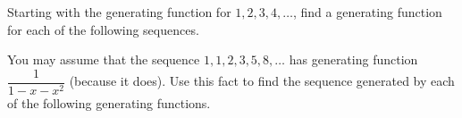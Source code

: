 \begin{squestions}
\question Starting with the generating function for $1,2,3,4, \ldots$, find a generating function for each of the following sequences.

	\begin{answer}
	\end{answer}






\question You may assume that the sequence $1, 1, 2, 3, 5, 8,\ldots$ has generating function $\dfrac{1}{1-x-x^2}$ (because it does).  Use this fact to find the sequence generated by each of the following generating functions.
\begin{parts}

\end{parts}
\end{squestions}
